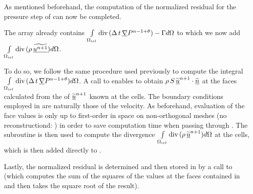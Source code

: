 
As mentioned beforehand, the computation of the normalized residual for the pressure step of  can now be completed.

The  array already contains
$\int\limits_{\Omega_{iel}}{\text{div}\,(\Delta\,t\,\underline{\nabla}{P^{n-1+\theta}}) -\Gamma d\Omega}$ to which we now add
$\int\limits_{\Omega_{iel}}{\text{div}\,(\rho\,\widetilde{\underline{u^{n+1}}})d\Omega}$.

To do so, we follow the same procedure used previously to compute the integral
$\int\limits_{\Omega_{iel}}{\text{div}\,(\Delta\,t\,\underline{\nabla}{P^{n-1+\theta}}) d\Omega}$. A call to
 enables to obtain
$\rho\,S\,\widetilde{\underline{u}}^{n+1}\cdot\widetilde{\underline{n}}$ at the faces calculated from the of
$\widetilde{\underline{u}}^{n+1}$ known at the cells. The boundary conditions
employed in  are naturally those of the velocity. As beforehand, evaluation of the face values is only up to first-order in space on non-orthogonal meshes (no reconstructiond: ) in order to save computation time when passing through . The subroutine  is then used to compute the divergence $\int\limits_{\Omega_{iel}}{\text{div}\,(\rho\,\widetilde{\underline{u}}^{n+1})d\Omega}$ at the cells, which is then added directly to .

Lastly, the normalized residual is determined and then stored in  by a call to   (which computes the sum of the squares of the values at the faces contained in  and then takes the square root of the result).\\


\newpage

